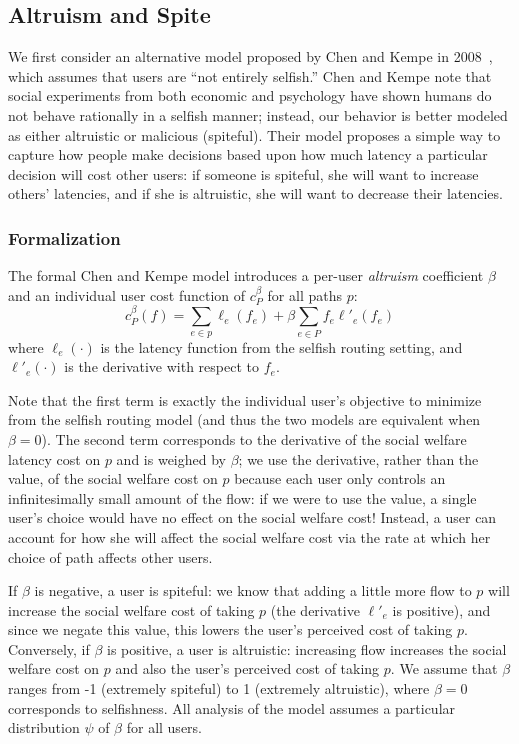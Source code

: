 \subsection{Altruism and Spite}
We first consider an alternative model proposed by Chen and Kempe in 2008~\cite{chen}, which assumes that users are ``not entirely selfish.''
Chen and Kempe note that social experiments from both economic and psychology have shown humans do not behave rationally in a selfish manner; instead, our behavior is better modeled as either altruistic or malicious (spiteful).
Their model proposes a simple way to capture how people make decisions based upon how much latency a particular decision will cost other users: if someone is spiteful, she will want to increase others' latencies, and if she is altruistic, she will want to decrease their latencies.

\subsubsection{Formalization}
The formal Chen and Kempe model introduces a per-user \emph{altruism} coefficient $\beta$ and an individual user cost function
of $c^\beta_P$ for all paths $p$:
$$c^\beta_P(f) = \sum_{e \in p} \ell_e(f_e) + \beta\sum_{e\in P} f_e\ell'_e(f_e)$$
where $\ell_e(\cdot)$ is the latency function from the selfish routing setting, and $\ell'_e(\cdot)$ is the derivative with respect to $f_e$.

Note that the first term is exactly the individual user's objective to minimize from the selfish routing model (and thus the two models are equivalent when $\beta = 0$). The second term corresponds to the derivative of the social welfare latency cost on $p$ and is weighed by $\beta$; we use the derivative, rather than the value, of the social welfare cost on $p$ because each user only controls an infinitesimally small amount of the flow: if we were to use the value, a single user's choice would have no effect on the social welfare cost! 
Instead, a user can account for how she will affect the social welfare cost via the rate at which her choice of path affects other users.

If $\beta$ is negative, a user is spiteful: we know that adding a little more flow to $p$ will increase the social welfare cost of taking $p$ (the derivative $\ell'_e$ is positive), and since we negate this value, this lowers the user's perceived cost of taking $p$.
Conversely, if $\beta$ is positive, a user is altruistic: increasing flow increases the social welfare cost on $p$ and also the user's perceived cost of taking $p$.
We assume that $\beta$ ranges from -1 (extremely spiteful) to 1 (extremely altruistic), where $\beta=0$ corresponds to selfishness.
All analysis of the model assumes a particular distribution $\psi$ of $\beta$ for all users. 

